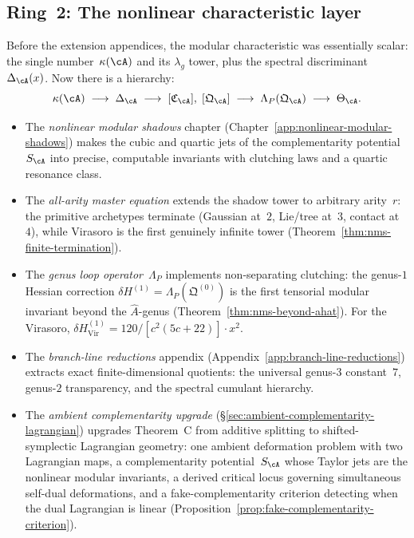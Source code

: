 \subsection*{Ring~2: The nonlinear characteristic layer}
Before the extension appendices, the modular characteristic was
essentially scalar: the single number~$\kappa(\cA)$ and its
$\lambda_g$ tower, plus the spectral
discriminant~$\Delta_\cA(x)$.  Now there is a hierarchy:
\[
\kappa(\cA)
\;\longrightarrow\;
\Delta_\cA
\;\longrightarrow\;
[\mathfrak{C}_\cA],\;
[\mathfrak{Q}_\cA]
\;\longrightarrow\;
\Lambda_P(\mathfrak{Q}_\cA)
\;\longrightarrow\;
\Theta_\cA.
\]
\begin{itemize}
\item The \emph{nonlinear modular shadows} chapter
  (Chapter~\ref{app:nonlinear-modular-shadows}) makes the
  cubic and quartic jets of the complementarity
  potential~$S_\cA$ into precise, computable invariants with
  clutching laws and a quartic resonance class.
\item The \emph{all-arity master equation} extends the shadow
  tower to arbitrary arity~$r$: the primitive archetypes terminate
  (Gaussian at~$2$, Lie/tree at~$3$, contact at~$4$), while
  Virasoro is the first genuinely infinite tower
  (Theorem~\ref{thm:nms-finite-termination}).
\item The \emph{genus loop operator}~$\Lambda_P$ implements
  non-separating clutching: the genus-$1$ Hessian correction
  $\delta H^{(1)}=\Lambda_P(\mathfrak Q^{(0)})$ is the first
  tensorial modular invariant beyond the $\hat{A}$-genus
  (Theorem~\ref{thm:nms-beyond-ahat}).  For the Virasoro,
  $\delta H^{(1)}_{\mathrm{Vir}}
  =120/[c^2(5c+22)]\cdot x^2$.
\item The \emph{branch-line reductions} appendix
  (Appendix~\ref{app:branch-line-reductions}) extracts exact
  finite-dimensional quotients: the universal genus-$3$
  constant~$7$, genus-$2$ transparency, and the spectral
  cumulant hierarchy.
\item The \emph{ambient complementarity upgrade}
  (\S\ref{sec:ambient-complementarity-lagrangian}) upgrades
  Theorem~C from additive splitting to shifted-symplectic
  Lagrangian geometry: one ambient deformation problem with two
  Lagrangian maps, a complementarity potential~$S_\cA$ whose
  Taylor jets are the nonlinear modular invariants, a derived
  critical locus governing simultaneous self-dual deformations,
  and a fake-complementarity criterion detecting when the dual
  Lagrangian is linear
  (Proposition~\ref{prop:fake-complementarity-criterion}).

\end{itemize}
